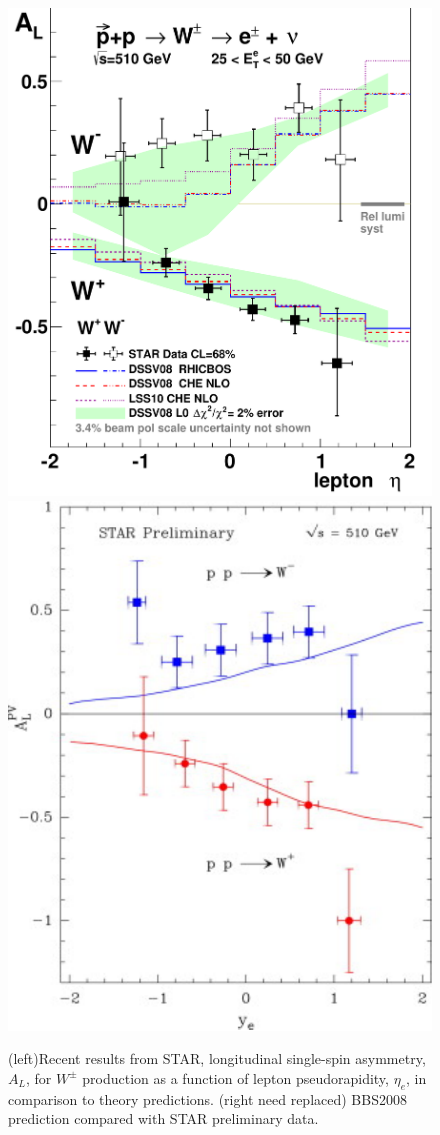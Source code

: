 \begin{figure} [htbp]
  \centering
    \includegraphics[width=0.50\linewidth]{figs_xj/STAR-WAL_2012.pdf}
    \includegraphics[width=0.47\linewidth]{figs_xj/BBS2008_STAR_Wpreliminary.pdf} \\
  \caption{\label{fig:STAR_W} (left)Recent results from STAR,  longitudinal single-spin asymmetry, $A_L$, for $W^\pm$ production as a function of lepton pseudorapidity, $\eta_e$, in comparison to theory predictions. (right need replaced) BBS2008 prediction compared with STAR preliminary data. }
\end{figure}

